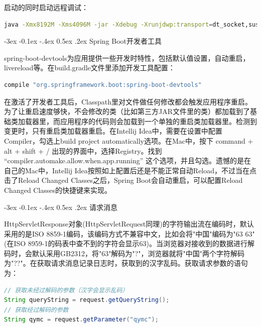 \documentclass[11pt,fleqn]{book}
\makeatletter
\numberwithin{dummy}{section}
\theoremstyle{ocrenumbox}
\theoremstyle{blacknumex}
\theoremstyle{blacknumbox}
\theoremstyle{ocrenum}
\renewcommand{\subsection}{\@startsection {subsection}{2}{\z@}
	{-3ex \@plus -0.1ex \@minus -.4ex}
	{0.5ex \@plus.2ex }
	{\normalfont\sffamily\bfseries}}
\newlength\esp
\makeatother
\begin{document}
启动的同时启动远程调试：

\begin{lstlisting}[language=Bash]
java -Xmx8192M -Xms4096M -jar -Xdebug -Xrunjdwp:transport=dt_socket,suspend=n,server=y,address=5005 /home/app/backend/credit-system-web-boot-1.1.28.jar --spring.config.location=application-jenkins.properties
\end{lstlisting}

\subsection{Spring Boot开发者工具}

spring-boot-devtools为应用提供一些开发时特性，包括默认值设置，自动重启，livereload等。在build.gradle文件里添加开发工具配置：

\begin{lstlisting}[language=Bash]
compile "org.springframework.boot:spring-boot-devtools"
\end{lstlisting}

在激活了开发者工具后，Classpath里对文件做任何修改都会触发应用程序重启。为了让重启速度够快，不会修改的类（比如第三方JAR文件里的类）都加载到了基础类加载器里，而应用程序的代码则会加载到一个单独的重启类加载器里。检测到变更时，只有重启类加载器重启。在Intellij Idea中，需要在设置中配置Compiler，勾选上build project automatically选项。在Mac中，按下 command + alt + shift + / 出现的界面中，选择Registry。找到 “compiler.automake.allow.when.app.running” 这个选项，并且勾选。遗憾的是在自己的Mac中，Intellij Idea按照如上配置后还是不能正常自动Reload，不过当在点击了Reload Changed Classes之后，Spring Boot会自动重启，可以配置Reload Changed Classes的快捷键来实现。

\subsection{请求消息}

HttpServletResponse对象(HttpServletRequest同理)的字符输出流在编码时，默认采用的是ISO 8859-1编码，该编码方式不兼容中文，比如会将"中国"编码为"63 63"(在ISO 8959-1的码表中查不到的字符会显示63)。当浏览器对接收到的数据进行解码时，会默认采用GB2312，将"63"解码为"?"，浏览器就将"中国"两个字符解码为"??"。在获取请求消息记录日志时，获取到的汉字乱码。获取请求参数的语句为：

\begin{lstlisting}[language=Java]
// 获取未经过解码的参数（汉字会显示乱码）
String queryString = request.getQueryString();
// 获取经过解码的参数
String qymc = request.getParameter("qymc");
\end{lstlisting}
\end{document}
